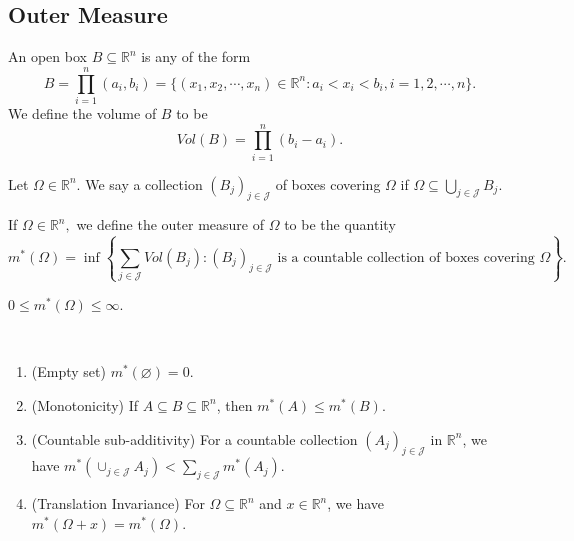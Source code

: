 
\subsection{Outer Measure}
\begin{definition}
    An open box $B\subseteq\mathbb{R}^n$ is any of the form 
    $$B=\prod_{i=1}^{n}(a_i, b_i)=\{(x_1,x_2,\cdots,x_n)\in\mathbb{R}^n:a_i<x_i<b_i, i=1,2,\cdots,n\}.$$
    We define the volume of $B$ to be 
    $$Vol(B)=\prod_{i=1}^{n}(b_i-a_i).$$
\end{definition}

\begin{definition}
    Let $\Omega\in\mathbb{R}^n$. We say a collection $(B_j)_{j\in\mathcal{J}}$ of boxes covering $\Omega$ if $\Omega\subseteq\bigcup_{j\in\mathcal{J}}B_j.$
\end{definition}

\begin{definition}
    If $\Omega\in\mathbb{R}^n,$ we define the outer measure of $\Omega$ to be the quantity
    \[m^*(\Omega)=\inf\left\{\sum_{j\in\mathcal{J}}Vol(B_j): (B_j)_{j\in\mathcal{J}} \text{ is a countable collection of boxes covering } \Omega\right\}.\]
\end{definition}

\begin{remark}
    $0\le m^*(\Omega)\le\infty.$
\end{remark}

\begin{theorem}\ \vspace{-2em}
    \begin{enumerate}
        \item (Empty set) $m^*(\varnothing)=0.$
        \item (Monotonicity) If $A\subseteq B\subseteq\mathbb{R}^n$, then $m^*(A)\le m^*(B).$
        \item (Countable sub-additivity) For a countable collection $(A_j)_{j\in\mathcal{J}}$ in $\mathbb{R}^n$, we have $m^*(\cup_{j\in\mathcal{J}}A_j)<\sum_{j\in\mathcal{J}}m^*(A_j).$ 
        \item (Translation Invariance) For $\Omega\subseteq\mathbb{R}^n$ and $x\in\mathbb{R}^n$, we have $m^*(\Omega+x)=m^*(\Omega).$
    \end{enumerate}
\end{theorem}

